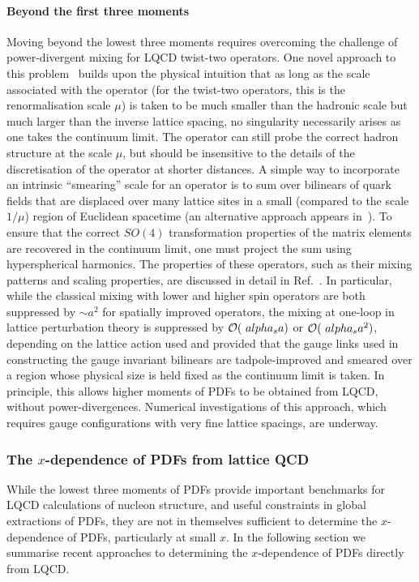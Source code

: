 \paragraph*{Beyond the first three moments} Moving beyond the lowest three moments requires overcoming the challenge of power-divergent mixing for LQCD twist-two operators. One novel approach to this problem~\cite{Davoudi:2012ya} builds upon the physical intuition that as long as the scale associated with the operator (for the twist-two operators, this is the renormalisation scale $\mu$) is taken to be much smaller than the hadronic scale but much larger than the inverse lattice spacing, no singularity necessarily arises as one takes the continuum limit. The operator can still probe the correct hadron structure at the scale $\mu$, but should be insensitive to the details of the discretisation of the operator at shorter distances. A simple way to incorporate an intrinsic ``smearing” scale for an operator is to sum over bilinears of quark fields that are displaced over many lattice sites in a small (compared to the scale $1/\mu$) region of Euclidean spacetime (an alternative approach appears in~\cite{Monahan:2015lha}). To ensure that the correct $SO(4)$ transformation properties of the matrix elements are recovered in the continuum limit, one must project the sum using hyperspherical harmonics. The properties of these operators, such as their mixing patterns and scaling properties, are discussed in detail in
Ref.~\cite{Davoudi:2012ya}. In particular, while the classical mixing with lower and higher spin operators are both suppressed by $\sim a^2$ for spatially improved operators, the mixing at one-loop in lattice perturbation theory is suppressed by ${\cal O}(\ alpha_s a)$ or ${\cal O}(\ alpha_s a^2)$, depending on the lattice action used and provided that the gauge links used in constructing the gauge invariant bilinears are tadpole-improved and smeared over a region whose physical size is held fixed as the continuum limit is taken. In principle, this allows higher moments of PDFs to be obtained from LQCD, without power-divergences. Numerical investigations of this approach,
which requires gauge configurations with very fine lattice spacings, are underway.

\subsubsection{The $x$-dependence of PDFs from lattice QCD}

While the lowest three moments of PDFs provide important benchmarks for LQCD calculations of nucleon structure, and useful constraints in global extractions of PDFs, they are not in themselves sufficient to determine the $x$-dependence of PDFs, particularly at small $x$. In the following section we summarise recent approaches to determining the $x$-dependence of PDFs directly from LQCD.

